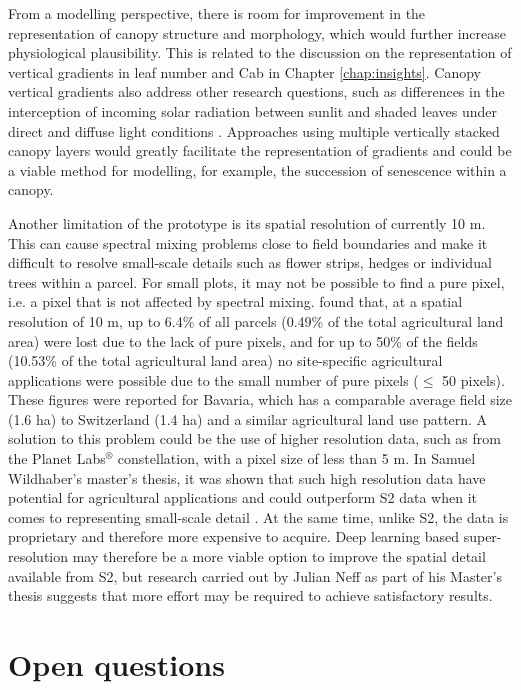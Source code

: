 From a modelling perspective, there is room for improvement in the representation of canopy structure and morphology, which would further increase physiological plausibility. This is related to the discussion on the representation of vertical gradients in leaf number and \gls{Cab} in Chapter \ref{chap:insights}. Canopy vertical gradients also address other research questions, such as differences in the interception of incoming solar radiation between sunlit and shaded leaves under direct and diffuse light conditions \citep{he_development_2013}. Approaches using multiple vertically stacked canopy layers would greatly facilitate the representation of gradients and could be a viable method for modelling, for example, the succession of senescence within a canopy.

Another limitation of the prototype is its spatial resolution of currently 10 m. This can cause spectral mixing problems close to field boundaries and make it difficult to resolve small-scale details such as flower strips, hedges or individual trees within a parcel. For small plots, it may not be possible to find a pure pixel, i.e. a pixel that is not affected by spectral mixing. \cite{meier_assessments_2020} found that, at a spatial resolution of 10 m, up to 6.4\% of all parcels (0.49\% of the total agricultural land area) were lost due to the lack of pure pixels, and for up to 50\% of the fields (10.53\% of the total agricultural land area) no site-specific agricultural applications were possible due to the small number of pure pixels ($\le$ 50 pixels). These figures were reported for Bavaria, which has a comparable average field size (1.6 ha) to Switzerland (1.4 ha) and a similar agricultural land use pattern. A solution to this problem could be the use of higher resolution data, such as from the Planet Labs$^{\circledR}$ constellation, with a pixel size of less than 5 m. In Samuel Wildhaber's master's thesis, it was shown that such high resolution data have potential for agricultural applications and could outperform \gls{S2} data when it comes to representing small-scale detail \citep{wildhaber_assessing_2023}. At the same time, unlike \gls{S2}, the data is proprietary and therefore more expensive to acquire. Deep learning based super-resolution may therefore be a more viable option to improve the spatial detail available from \gls{S2}, but research carried out by Julian Neff as part of his Master's thesis suggests that more effort may be required to achieve satisfactory results.

\section{Open questions}
\label{sec:disc-open-questions}
